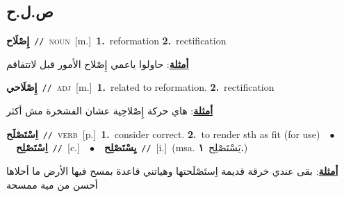 \documentclass[10pt,a4paper,twoside]{article} %
\begin{document}
\begin{multicols}{2}
\vspace{-3mm}
\subsection*{\color{blue}\foreignlanguage{arabic}{ص.ل.ح}\color{blue}{}} 

{\setlength\topsep{0pt}\textbf{\foreignlanguage{arabic}{إِصْلَاح}}\ {\color{gray}\texttt{//}\color{black}}\ \textsc{noun}\ [m.]\ \textbf{1.}~reformation  \textbf{2.}~rectification\  \begin{flushright}\color{gray}\foreignlanguage{arabic}{\textbf{\underline{\foreignlanguage{arabic}{أمثلة}}}: حاولوا ياعمي إِصْلاح الأمور قبل لاتتفاقم}\end{flushright}\color{black}} \vspace{2mm}

{\setlength\topsep{0pt}\textbf{\foreignlanguage{arabic}{إِصْلَاحي}}\ {\color{gray}\texttt{//}\color{black}}\ \textsc{adj}\ [m.]\ \textbf{1.}~related to reformation.  \textbf{2.}~rectification\  \begin{flushright}\color{gray}\foreignlanguage{arabic}{\textbf{\underline{\foreignlanguage{arabic}{أمثلة}}}: هاي حركة إِصْلاحِية عشان الفشخرة مش أكثر}\end{flushright}\color{black}} \vspace{2mm}

{\setlength\topsep{0pt}\textbf{\foreignlanguage{arabic}{اِسْتَصْلَح}}\ {\color{gray}\texttt{//}\color{black}}\ \textsc{verb}\ [p.]\ \textbf{1.}~consider correct.  \textbf{2.}~to render sth as fit (for use)\ \ $\bullet$\ \ \setlength\topsep{0pt}\textbf{\foreignlanguage{arabic}{اِسْتَصْلِح}}\ {\color{gray}\texttt{//}\color{black}}\ [c.]\ \ $\bullet$\ \ \setlength\topsep{0pt}\textbf{\foreignlanguage{arabic}{يِسْتَصْلِح}}\ {\color{gray}\texttt{//}\color{black}}\ [i.]\ \color{gray}(msa. \foreignlanguage{arabic}{يَسْتَصْلِح}~\foreignlanguage{arabic}{\textbf{١.}})\color{black}\  \begin{flushright}\color{gray}\foreignlanguage{arabic}{\textbf{\underline{\foreignlanguage{arabic}{أمثلة}}}: بقى عندي خرقة قديمة اِستَصْلَحتها وهياتني قاعدة بمسح فيها الأرض ما أحلاها أحسن من مية ممسحة}\end{flushright}\color{black}} \vspace{2mm}


\end{multicols}
\end{document}
